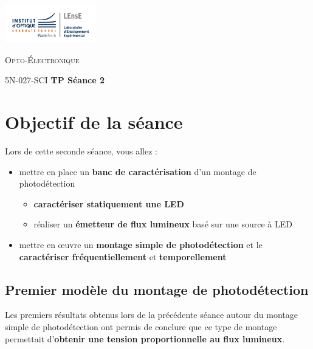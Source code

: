 \newpage

\begin{minipage}[c]{.25\linewidth}
	\includegraphics[width=4cm]{images/Logo-LEnsE.png}
\end{minipage} \hfill
\begin{minipage}[c]{.4\linewidth}

\begin{center}
\vspace{0.3cm}
{\Large \textsc{Opto-Électronique}}

\medskip

5N-027-SCI \qquad \textbf{\Large TP Séance 2}

\end{center}
\end{minipage}\hfill

\section{Objectif de la séance}

Lors de cette seconde séance, vous allez :

\begin{itemize}
	\item mettre en place un \textbf{banc de caractérisation} d'un montage de photodétection
	\begin{itemize}
		\item \textbf{caractériser statiquement une LED}	
		\item réaliser un \textbf{émetteur de flux lumineux} basé sur une source à LED
	\end{itemize} 
	
	\item mettre en \oe{}uvre un \textbf{montage simple de photodétection} et le \textbf{caractériser fréquentiellement} et \textbf{temporellement}
\end{itemize} 


\subsection{Premier modèle du montage de photodétection}

Les premiers résultats obtenus lors de la précédente séance autour du montage simple de photodétection ont permis de conclure que ce type de montage permettait d'\textbf{obtenir une tension proportionnelle au flux lumineux}.

